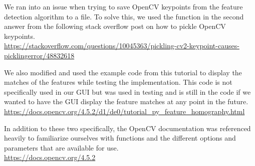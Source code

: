 \documentclass[12pt]{article}
\begin{document}
	We ran into an issue when trying to save OpenCV keypoints from the feature detection algorithm to a file. To solve this, we used the function in the second answer from the following stack overflow post on how to pickle OpenCV keypoints. \\
	\url{https://stackoverflow.com/questions/10045363/pickling-cv2-keypoint-causes-picklingerror/48832618}
	
	
	We also modified and used the example code from this tutorial to display the matches of the features while testing the implementation. This code is not specifically used in our GUI but was used in testing and is still in the code if we wanted to have the GUI display the feature matches at any point in the future. \\
	\url{https://docs.opencv.org/4.5.2/d1/de0/tutorial_py_feature_homography.html}
	
	In addition to these two specifically, the OpenCV documentation was referenced heavily to familiarize ourselves with functions and the different options and parameters that are available for use. \\
	\url{https://docs.opencv.org/4.5.2}
\end{document}
